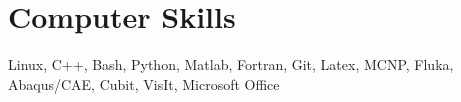 %
%
\section{Computer Skills}
Linux, C++, Bash, Python, Matlab, Fortran, Git, Latex, MCNP, Fluka, Abaqus/CAE,
Cubit, VisIt, Microsoft Office 
